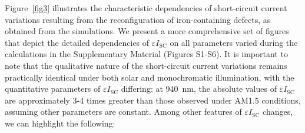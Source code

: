 \documentclass[a4paper,fleqn]{cas-sc}
\begin{document}
Figure~\ref{fig3} illustrates the characteristic dependencies of short-circuit current variations resulting from the reconfiguration of iron-containing defects, as obtained from the simulations. We present a more comprehensive set of figures that depict the detailed dependencies of $\varepsilon I_\mathrm{SC}$ on all parameters varied during the calculations in the Supplementary Material (Figures S1-S6). It is important to note that the qualitative nature of the short-circuit current variations remains practically identical under both solar and monochromatic illumination, with the quantitative parameters of $\varepsilon I_\mathrm{SC}$ differing: at 940~nm, the absolute values of $\varepsilon I_\mathrm{SC}$ are approximately 3-4 times greater than those observed under AM1.5 conditions, assuming other parameters are constant. Among other features of $\varepsilon I_\mathrm{SC}$ changes, we can highlight the following:
\end{document}
